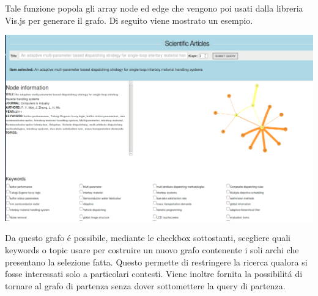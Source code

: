\documentclass[11pt,a4paper]{article}
\begin{document}
Tale funzione popola gli array node ed edge che vengono poi usati dalla libreria Vis.js per generare il grafo. Di seguito viene mostrato un esempio.
\begin{center}
\centering
\includegraphics[scale=0.40]{immaginiTesina/2layer.png}
\newline \newline
\end{center}

Da questo grafo \'e possibile, mediante le checkbox sottostanti, scegliere quali keywords o topic usare per costruire un nuovo grafo contenente i soli archi che presentano la selezione fatta. Questo permette di restringere la ricerca qualora si fosse interessati solo a particolari contesti. Viene inoltre fornita la possibilit\'a di tornare al grafo di partenza senza dover sottomettere la query di partenza.
\newline \newline
\end{document}
